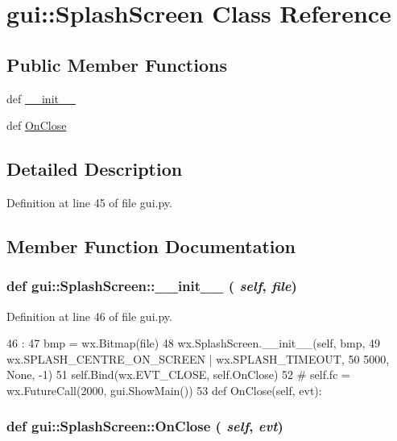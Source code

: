 \hypertarget{classgui_1_1SplashScreen}{
\section{gui::SplashScreen Class Reference}
\label{classgui_1_1SplashScreen}
}
\subsection*{Public Member Functions}
\begin{DoxyCompactItemize}
\item 
def \hyperlink{classgui_1_1SplashScreen_a08e9365f0b47bb455680041a0633e3c8}{\_\-\_\-init\_\-\_\-}
\item 
def \hyperlink{classgui_1_1SplashScreen_adb3ce57f701b24353cf0985e730c75aa}{OnClose}
\end{DoxyCompactItemize}


\subsection{Detailed Description}


Definition at line 45 of file gui.py.

\subsection{Member Function Documentation}
\hypertarget{classgui_1_1SplashScreen_a08e9365f0b47bb455680041a0633e3c8}{
\subsubsection[{\_\-\_\-init\_\-\_\-}]{\setlength{\rightskip}{0pt plus 5cm}def gui::SplashScreen::\_\-\_\-init\_\-\_\- ( {\em self}, \/   {\em file})}}
\label{classgui_1_1SplashScreen_a08e9365f0b47bb455680041a0633e3c8}


Definition at line 46 of file gui.py.


\begin{DoxyCode}
46                             :
47         bmp = wx.Bitmap(file)
48         wx.SplashScreen.__init__(self, bmp,
49                                  wx.SPLASH_CENTRE_ON_SCREEN | wx.SPLASH_TIMEOUT,
50                                  5000, None, -1)
51         self.Bind(wx.EVT_CLOSE, self.OnClose)
52         #        self.fc = wx.FutureCall(2000, gui.ShowMain())
53 
    def OnClose(self, evt):
\end{DoxyCode}
\hypertarget{classgui_1_1SplashScreen_adb3ce57f701b24353cf0985e730c75aa}{
\subsubsection[{OnClose}]{\setlength{\rightskip}{0pt plus 5cm}def gui::SplashScreen::OnClose ( {\em self}, \/   {\em evt})}}
\label{classgui_1_1SplashScreen_adb3ce57f701b24353cf0985e730c75aa}


